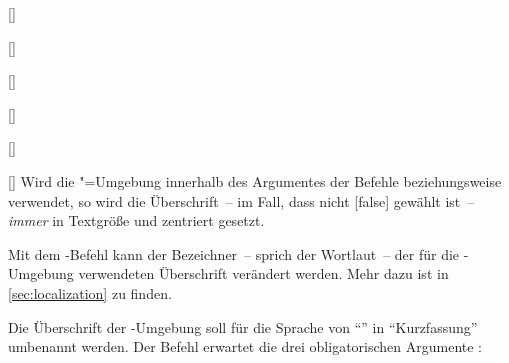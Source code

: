\begin{Declaration}{[]}
\begin{Declaration}[v2.02]{}
\begin{Declaration}{[]}
\begin{Declaration}[v2.02]{%
  []%
}
\begin{Declaration}[v2.02]{%
  []%
}
\begin{Declaration}{[]}
\begin{Declaration}{[\PSet]}{%
}
Wird die "=Umgebung innerhalb des Argumentes der Befehle 
 beziehungsweise  verwendet, 
so wird die Überschrift~-- im Fall, dass nicht [false] gewählt 
ist~-- \emph{immer} in Textgröße und zentriert gesetzt.
\end{Declaration}
\end{Declaration}
\end{Declaration}
\end{Declaration}
\end{Declaration}
\end{Declaration}
\end{Declaration}

Mit dem \KOMAScript-Befehl  kann der Bezeichner~-- 
sprich der Wortlaut~-- der für die -Umgebung verwendeten 
Überschrift verändert werden. Mehr dazu ist in \autoref{sec:localization} zu 
finden.
%
\begin{Example}
Die Überschrift der -Umgebung soll für die Sprache 
 von \enquote{\abstractname} in \enquote{Kurzfassung} umbenannt 
werden. Der Befehl  erwartet die drei obligatorischen 
Argumente :
\begin{Code}[escapechar=§]
\end{Code}
\end{Example}
%
%


